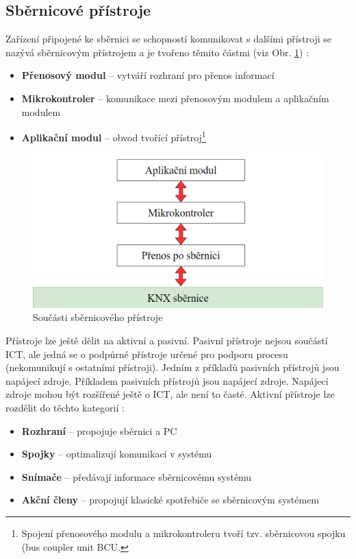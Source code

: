 \subsection{Sběrnicové přístroje}
Zařízení připojené ke sběrnici se schopností komunikovat s dalšími přístroji se nazývá sběrnicovým přístrojem a je tvořeno těmito částmi (viz Obr. \ref{fig:Součásti sběrnicového přístroje}) \cite{KNX principles}:

\begin{itemize}
\item \textbf{Přenosový modul} -- vytváří rozhraní pro přenos informací
\item \textbf{Mikrokontroler} -- komunikace mezi přenosovým modulem a aplikačním modulem
\item \textbf{Aplikační modul} -- obvod tvořící přístroj\footnote{Spojení přenosového modulu a mikrokontroleru tvoří tzv. sběrnicovou spojku (bus coupler unit BCU.}
\end{itemize}
\begin{figure}[!h]
  \begin{center}
    \includegraphics[scale=0.7]{obrazky/sbernice.png}
  \end{center}
  \caption[Součásti sběrnicového přístroje \cite{KNX principles}] {Součásti sběrnicového přístroje \cite{KNX principles}}
  \label{fig:Součásti sběrnicového přístroje}
\end{figure}
Přístroje lze ještě dělit na aktivní a pasivní. Pasivní přístroje nejsou součástí ICT, ale jedná se o podpůrné přístroje určené pro podporu procesu (nekomunikují s ostatními přístroji). Jedním z příkladů pasivních přístrojů jsou napájecí zdroje. Příkladem pasivních přístrojů jsou napájecí zdroje. Napájecí zdroje mohou být rozšířené ještě o ICT, ale není to časté.  
Aktivní přístroje lze rozdělit do těchto kategorií \cite{KNX principles}:
\begin{itemize}
\item \textbf{Rozhraní} -- propojuje sběrnici a PC
\item \textbf{Spojky} -- optimalizují komunikaci v systému
\item \textbf{Snímače} -- předávají informace sběrnicovému systému
\item \textbf{Akční členy} -- propojují klasické spotřebiče se sběrnicovým systémem
\end{itemize}

